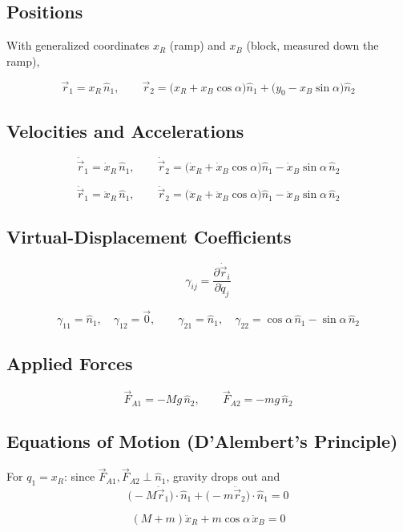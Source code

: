 \documentclass[11pt]{article}
\begin{document}
\subsection*{Positions}

With generalized coordinates $x_R$ (ramp) and $x_B$ (block, measured down the ramp),
\begin{result}
\[
    \vec r_1 = x_R\,\hat n_1,
    \qquad
    \vec r_2 = \big(x_R+x_B\cos\alpha\big)\hat n_1 + \big(y_0-x_B\sin\alpha\big)\hat n_2
\]
\end{result}

\subsection*{Velocities and Accelerations}

\[
    \dot{\vec r}_1 = \dot x_R\,\hat n_1,
    \qquad
    \dot{\vec r}_2 = \big(\dot x_R+\dot x_B\cos\alpha\big)\hat n_1 - \dot x_B\sin\alpha\,\hat n_2
\]
\begin{result}
\[
    \ddot{\vec r}_1 = \ddot x_R\,\hat n_1,
    \qquad
    \ddot{\vec r}_2 = \big(\ddot x_R+\ddot x_B\cos\alpha\big)\hat n_1 - \ddot x_B\sin\alpha\,\hat n_2
\]
\end{result}

\subsection*{Virtual-Displacement Coefficients}

\[
    \gamma_{ij} = \frac{\partial\dot{\vec r}_i}{\partial\dot q_j}
\]
\begin{result}
\[
    \gamma_{11}=\hat n_1,\quad \gamma_{12}=\vec 0,
    \qquad
    \gamma_{21}=\hat n_1,\quad \gamma_{22}=\cos\alpha\,\hat n_1 - \sin\alpha\,\hat n_2
\]
\end{result}

\subsection*{Applied Forces}

\[
    \vec F_{A1} = -Mg\,\hat n_2,
    \qquad
    \vec F_{A2} = -mg\,\hat n_2
\]

\subsection*{Equations of Motion (D'Alembert's Principle)}

For $q_1=x_R$: since $\vec F_{A1},\vec F_{A2}\perp\hat n_1$, gravity drops out and
\[
    \big(-M\ddot{\vec r}_1\big)\cdot\hat n_1 + \big(-m\ddot{\vec r}_2\big)\cdot\hat n_1 = 0
\]
\begin{result}
\[
    (M+m)\ddot x_R + m\cos\alpha\,\ddot x_B = 0
\]
\end{result}
\end{document}
